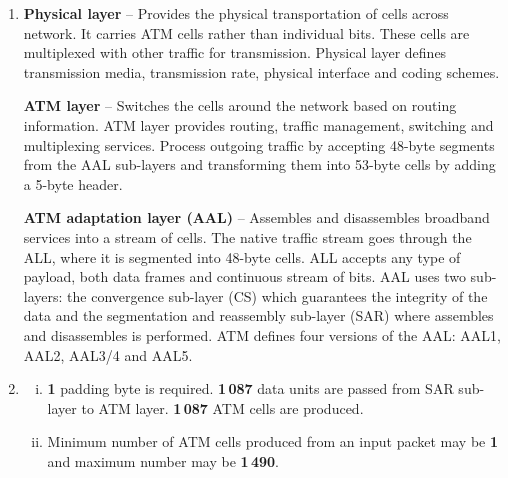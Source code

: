 \documentclass[a4paper, 11pt]{article}
\begin{document}
\begin{enumerate}

		\item %
			\textbf{Physical layer} -- Provides the physical transportation of cells across network. It carries ATM
			cells rather than individual bits. These cells are multiplexed with other traffic for transmission.
			Physical layer defines transmission media, transmission rate, physical interface and coding schemes.

			\textbf{ATM layer} -- Switches the cells around the network based on routing information. ATM layer
			provides routing, traffic management, switching and multiplexing services. Process outgoing traffic by
			accepting 48-byte segments from the AAL sub-layers and transforming them into 53-byte cells by adding
			a 5-byte header.

			\textbf{ATM adaptation layer (AAL)} -- Assembles and disassembles broadband services into a stream of
			cells. The native traffic stream goes through the ALL, where it is segmented into 48-byte cells. ALL
			accepts any type of payload, both data frames and continuous stream of bits. AAL uses two sub-layers:
			the convergence sub-layer (CS) which guarantees the integrity of the data and the segmentation and
			reassembly sub-layer (SAR) where assembles and disassembles is performed. ATM defines four versions
			of the AAL: AAL1, AAL2, AAL3/4 and AAL5.

		\item %
			\begin{enumerate}[i)]
				\item %
					\textbf{1} padding byte is required. \textbf{1\,087} data units are passed from SAR sub-layer to
					ATM layer. \textbf{1\,087} ATM cells are produced.

				\item %
					Minimum number of ATM cells produced from an input packet may be \textbf{1} and maximum number
					may be \textbf{1\,490}.


\end{enumerate}
\end{enumerate}
\end{document}
